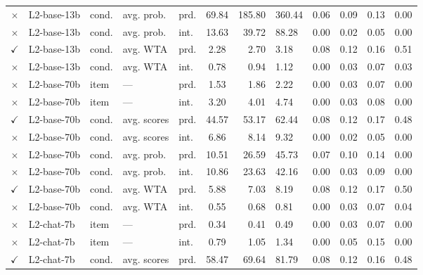 \documentclass[fleqn]{article}
\begin{document}
\begin{table}[]
\begin{tabular}{cllllcrlcrlc}
  \textcolor{shimmer-main}{$\times$} & L2-base-13b   & cond. & avg. prob.  & prd. & 69.84 & 185.80 & 360.44 & 0.06 & 0.09 & 0.13 & 0.00 \\
  \textcolor{shimmer-main}{$\times$} & L2-base-13b   & cond. & avg. prob.  & int. & 13.63 & 39.72  & 88.28  & 0.00 & 0.02 & 0.05 & 0.00 \\
  \textcolor{fern-main}{$\checkmark$} & L2-base-13b   & cond. & avg. WTA    & prd. & 2.28  & 2.70   & 3.18   & 0.08 & 0.12 & 0.16 & 0.51 \\
  \textcolor{shimmer-main}{$\times$} & L2-base-13b   & cond. & avg. WTA    & int. & 0.78  & 0.94   & 1.12   & 0.00 & 0.03 & 0.07 & 0.03 \\ \addlinespace[0.5em]
  \textcolor{shimmer-main}{$\times$} & L2-base-70b   & item  & ---         & prd. & 1.53  & 1.86   & 2.22   & 0.00 & 0.03 & 0.07 & 0.00 \\
  \textcolor{shimmer-main}{$\times$} & L2-base-70b   & item  & ---         & int. & 3.20  & 4.01   & 4.74   & 0.00 & 0.03 & 0.08 & 0.00 \\
  \textcolor{fern-main}{$\checkmark$} & L2-base-70b   & cond. & avg. scores & prd. & 44.57 & 53.17  & 62.44  & 0.08 & 0.12 & 0.17 & 0.48 \\
  \textcolor{shimmer-main}{$\times$} & L2-base-70b   & cond. & avg. scores & int. & 6.86  & 8.14   & 9.32   & 0.00 & 0.02 & 0.05 & 0.00 \\
  \textcolor{shimmer-main}{$\times$} & L2-base-70b   & cond. & avg. prob.  & prd. & 10.51 & 26.59  & 45.73  & 0.07 & 0.10 & 0.14 & 0.00 \\
  \textcolor{shimmer-main}{$\times$} & L2-base-70b   & cond. & avg. prob.  & int. & 10.86 & 23.63  & 42.16  & 0.00 & 0.03 & 0.09 & 0.00 \\
  \textcolor{fern-main}{$\checkmark$} & L2-base-70b   & cond. & avg. WTA    & prd. & 5.88  & 7.03   & 8.19   & 0.08 & 0.12 & 0.17 & 0.50 \\
  \textcolor{shimmer-main}{$\times$} & L2-base-70b   & cond. & avg. WTA    & int. & 0.55  & 0.68   & 0.81   & 0.00 & 0.03 & 0.07 & 0.04 \\ \addlinespace[0.5em]
  \textcolor{shimmer-main}{$\times$} & L2-chat-7b  & item  & ---         & prd. & 0.34  & 0.41   & 0.49   & 0.00 & 0.03 & 0.07 & 0.00 \\
  \textcolor{shimmer-main}{$\times$} & L2-chat-7b  & item  & ---         & int. & 0.79  & 1.05   & 1.34   & 0.00 & 0.05 & 0.15 & 0.00 \\
  \textcolor{fern-main}{$\checkmark$} & L2-chat-7b  & cond. & avg. scores & prd. & 58.47 & 69.64  & 81.79  & 0.08 & 0.12 & 0.16 & 0.48 \\

\end{tabular}
\end{table}
\end{document}
